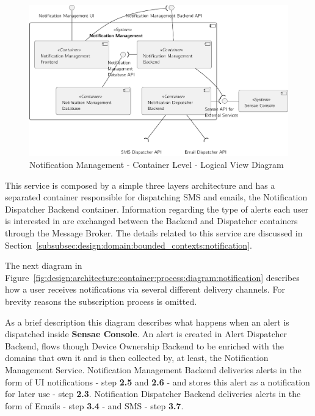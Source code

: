 \begin{figure}[H]
   \centering
   \includegraphics[page=1,width=0.8\columnwidth]{assets/diagrams/design/architectural/level2/logical/notification-management-context.pdf}
   \caption[Notification Management - Container Level - Logical View Diagram]{Notification Management - Container Level - Logical View Diagram}
   \label{fig:design:architecture:solutions:containers:logical:noti}
\end{figure}

This service is composed by a simple three layers architecture and has a separated container responsible for dispatching SMS and emails, the Notification Dispatcher Backend container. Information regarding the type of alerts each user is interested in are exchanged between the Backend and Dispatcher containers through the Message Broker. The details related to this service are discussed in Section~\ref{subsubsec:design:domain:bounded_contexts:notification}.

The next diagram in Figure~\ref{fig:design:architecture:container:process:diagram:notification} describes how a user receives notifications via several different delivery channels. For brevity reasons the subscription process is omitted.

As a brief description this diagram describes what happens when an alert is dispatched inside \textbf{Sensae Console}. An alert is created in Alert Dispatcher Backend, flows though Device Ownership Backend to be enriched with the domains that own it and is then collected by, at least, the Notification Management Service. Notification Management Backend deliveries alerts in the form of \gls{UI} notifications - step \textbf{2.5} and \textbf{2.6} - and stores this alert as a notification for later use - step \textbf{2.3}. Notification Dispatcher Backend deliveries alerts in the form of Emails - step \textbf{3.4} - and SMS - step \textbf{3.7}.

